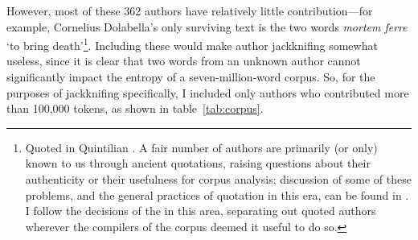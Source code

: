 \documentclass[12pt,twoside,leqno]{article} %
\begin{document}
However, most of these 362 authors have relatively little contribution---for example, Cornelius Dolabella's only surviving text is the two words \emph{mortem ferre} `to bring death'\footnote{Quoted in Quintilian \citep[VIII.2.4]{quintilian}. A fair number of authors are primarily (or only) known to us through ancient quotations, raising questions about their authenticity or their usefulness for corpus analysis; discussion of some of these problems, and the general practices of quotation in this era, can be found in \citet{vandenhoek}. I follow the decisions of the \citeauthor{phi} in this area, separating out quoted authors wherever the compilers of the corpus deemed it useful to do so.}. Including these would make author jackknifing somewhat useless, since it is clear that two words from an unknown author cannot significantly impact the entropy of a seven-million-word corpus. So, for the purposes of jackknifing specifically, I included only authors who contributed more than 100,000 tokens, as shown in table~\ref{tab:corpus}.
\end{document}
